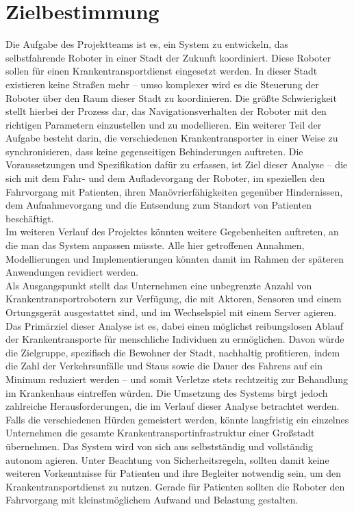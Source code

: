 
\section{Zielbestimmung}
Die Aufgabe des Projektteams ist es, ein System zu entwickeln, das selbstfahrende Roboter in einer Stadt der Zukunft koordiniert. Diese Roboter sollen für einen Krankentransportdienst eingesetzt werden. In dieser Stadt existieren keine Straßen mehr – umso komplexer wird es die Steuerung der Roboter über den Raum dieser Stadt zu koordinieren. Die größte Schwierigkeit stellt hierbei der Prozess dar, das Navigationsverhalten der Roboter mit den richtigen Parametern einzustellen und zu modellieren. Ein weiterer Teil der Aufgabe besteht darin, die verschiedenen Krankentransporter in einer Weise zu synchronisieren, dass keine gegenseitigen Behinderungen auftreten. Die Voraussetzungen und Spezifikation dafür zu erfassen, ist Ziel dieser Analyse – die sich mit dem Fahr- und dem Aufladevorgang der Roboter, im speziellen den Fahrvorgang mit Patienten, ihren Manövrierfähigkeiten gegenüber Hindernissen, dem Aufnahmevorgang und die Entsendung zum Standort von Patienten beschäftigt.\\

Im weiteren Verlauf des Projektes könnten weitere Gegebenheiten auftreten, an die man das System anpassen müsste. Alle hier getroffenen Annahmen, Modellierungen und Implementierungen könnten damit im Rahmen der späteren Anwendungen revidiert werden.\\

Als Ausgangspunkt stellt das Unternehmen eine unbegrenzte Anzahl von Krankentransportrobotern zur Verfügung, die mit Aktoren, Sensoren und einem Ortungsgerät ausgestattet sind, und im Wechselspiel mit einem Server agieren.\\

Das Primärziel dieser Analyse ist es, dabei einen möglichst reibungslosen Ablauf der Krankentransporte für menschliche Individuen zu ermöglichen. Davon würde die Zielgruppe, spezifisch die Bewohner der Stadt, nachhaltig profitieren, indem die Zahl der Verkehrsunfälle und Staus sowie die Dauer des Fahrens auf ein Minimum reduziert werden – und somit Verletze stets rechtzeitig zur Behandlung im Krankenhaus eintreffen würden. Die Umsetzung des Systems birgt jedoch zahlreiche Herausforderungen, die im Verlauf dieser Analyse betrachtet werden. Falls die verschiedenen Hürden gemeistert werden, könnte langfristig ein einzelnes Unternehmen die gesamte Krankentransportinfrastruktur einer Großstadt übernehmen. Das System wird von sich aus selbstständig und vollständig autonom agieren. Unter Beachtung von Sicherheitsregeln, sollten damit keine weiteren Vorkenntnisse für Patienten und ihre Begleiter notwendig sein, um den Krankentransportdienst zu nutzen. Gerade für Patienten sollten die Roboter den Fahrvorgang mit kleinstmöglichem Aufwand und Belastung gestalten.\\
